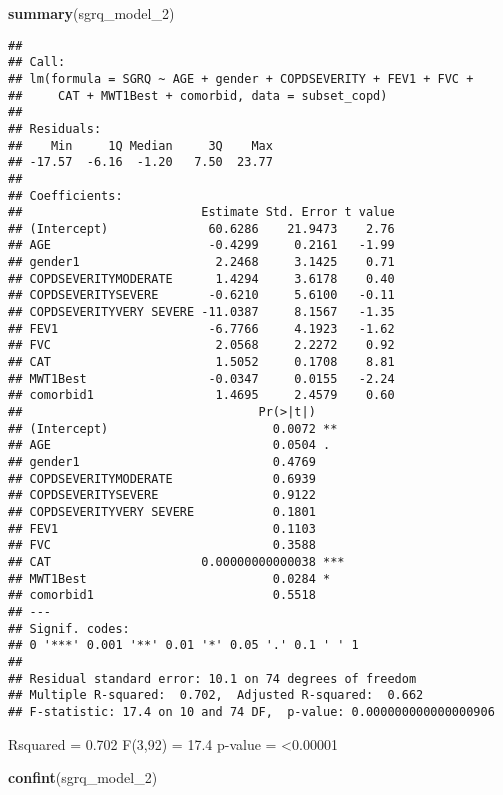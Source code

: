 \documentclass[
]{article}
\newenvironment{Shaded}{\begin{snugshade}}{\end{snugshade}}
\newcommand{\FunctionTok}[1]{\textcolor[rgb]{0.13,0.29,0.53}{\textbf{#1}}}
\newcommand{\NormalTok}[1]{#1}
\begin{document}
\begin{Shaded}
\begin{Highlighting}[]
\FunctionTok{summary}\NormalTok{(sgrq\_model\_2)}
\end{Highlighting}
\end{Shaded}

\begin{verbatim}
## 
## Call:
## lm(formula = SGRQ ~ AGE + gender + COPDSEVERITY + FEV1 + FVC + 
##     CAT + MWT1Best + comorbid, data = subset_copd)
## 
## Residuals:
##    Min     1Q Median     3Q    Max 
## -17.57  -6.16  -1.20   7.50  23.77 
## 
## Coefficients:
##                         Estimate Std. Error t value
## (Intercept)              60.6286    21.9473    2.76
## AGE                      -0.4299     0.2161   -1.99
## gender1                   2.2468     3.1425    0.71
## COPDSEVERITYMODERATE      1.4294     3.6178    0.40
## COPDSEVERITYSEVERE       -0.6210     5.6100   -0.11
## COPDSEVERITYVERY SEVERE -11.0387     8.1567   -1.35
## FEV1                     -6.7766     4.1923   -1.62
## FVC                       2.0568     2.2272    0.92
## CAT                       1.5052     0.1708    8.81
## MWT1Best                 -0.0347     0.0155   -2.24
## comorbid1                 1.4695     2.4579    0.60
##                                 Pr(>|t|)    
## (Intercept)                       0.0072 ** 
## AGE                               0.0504 .  
## gender1                           0.4769    
## COPDSEVERITYMODERATE              0.6939    
## COPDSEVERITYSEVERE                0.9122    
## COPDSEVERITYVERY SEVERE           0.1801    
## FEV1                              0.1103    
## FVC                               0.3588    
## CAT                     0.00000000000038 ***
## MWT1Best                          0.0284 *  
## comorbid1                         0.5518    
## ---
## Signif. codes:  
## 0 '***' 0.001 '**' 0.01 '*' 0.05 '.' 0.1 ' ' 1
## 
## Residual standard error: 10.1 on 74 degrees of freedom
## Multiple R-squared:  0.702,  Adjusted R-squared:  0.662 
## F-statistic: 17.4 on 10 and 74 DF,  p-value: 0.000000000000000906
\end{verbatim}

Rsquared = 0.702 F(3,92) = 17.4 p-value = \textless0.00001

\begin{Shaded}
\begin{Highlighting}[]
\FunctionTok{confint}\NormalTok{(sgrq\_model\_2)}
\end{Highlighting}
\end{Shaded}
\end{document}
